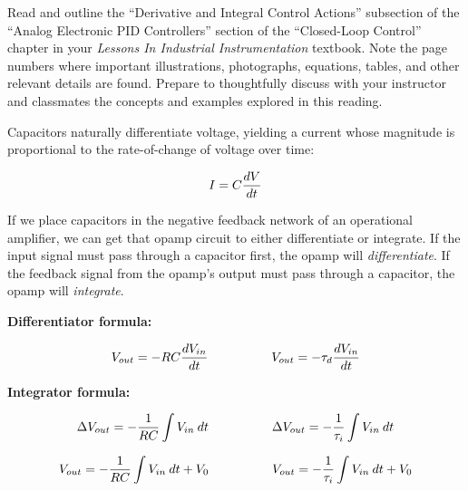 

Read and outline the ``Derivative and Integral Control Actions'' subsection of the ``Analog Electronic PID Controllers'' section of the ``Closed-Loop Control'' chapter in your {\it Lessons In Industrial Instrumentation} textbook.  Note the page numbers where important illustrations, photographs, equations, tables, and other relevant details are found.  Prepare to thoughtfully discuss with your instructor and classmates the concepts and examples explored in this reading.














Capacitors naturally differentiate voltage, yielding a current whose magnitude is proportional to the rate-of-change of voltage over time:

$$I = C {dV \over dt}$$

If we place capacitors in the negative feedback network of an operational amplifier, we can get that opamp circuit to either differentiate or integrate.  If the input signal must pass through a capacitor first, the opamp will {\it differentiate}.  If the feedback signal from the opamp's output must pass through a capacitor, the opamp will {\it integrate}.

\vskip 10pt

\noindent
{\bf Differentiator formula:}

$$V_{out} = -RC {dV_{in} \over dt} \hskip 50pt V_{out} = -\tau_d {dV_{in} \over dt}$$

\vskip 10pt

\noindent
{\bf Integrator formula:}

$$\Delta V_{out} = -{1 \over RC} \int V_{in} \> dt \hskip 50pt \Delta V_{out} = -{1 \over \tau_i} \int V_{in} \> dt$$

$$V_{out} = -{1 \over RC} \int V_{in} \> dt + V_0 \hskip 50pt V_{out} = -{1 \over \tau_i} \int V_{in} \> dt + V_0$$








